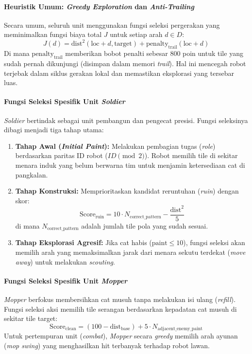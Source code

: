 \paragraph{Heuristik Umum: \textit{Greedy Exploration} dan \textit{Anti-Trailing}}
Secara umum, seluruh unit menggunakan fungsi seleksi pergerakan yang meminimalkan fungsi biaya total $J$ untuk setiap arah $d \in D$:
\begin{equation}
    J(d) = \text{dist}^2(\text{loc} + d, \text{target}) + \text{penalty}_{\text{trail}}(\text{loc} + d)
\end{equation}
Di mana $\text{penalty}_{\text{trail}}$ memberikan bobot penalti sebesar 800 poin untuk tile yang sudah pernah dikunjungi (disimpan dalam memori \textit{trail}). Hal ini mencegah robot terjebak dalam siklus gerakan lokal dan memastikan eksplorasi yang tersebar luas.

\paragraph{Fungsi Seleksi Spesifik Unit \textit{Soldier}}
\textit{Soldier} bertindak sebagai unit pembangun dan pengecat presisi. Fungsi seleksinya dibagi menjadi tiga tahap utama:
\begin{enumerate}
    \item \textbf{Tahap Awal (\textit{Initial Paint}):} Melakukan pembagian tugas (\textit{role}) berdasarkan paritas ID robot ($ID \pmod 2$). Robot memilih tile di sekitar menara induk yang belum berwarna tim untuk menjamin ketersediaan cat di pangkalan.
    \item \textbf{Tahap Konstruksi:} Memprioritaskan kandidat reruntuhan (\textit{ruin}) dengan skor:
    \begin{equation}
        \text{Score}_{\text{ruin}} = 10 \cdot N_{\text{correct\_pattern}} - \frac{\text{dist}^2}{5}
    \end{equation}
    di mana $N_{\text{correct\_pattern}}$ adalah jumlah tile pola yang sudah sesuai.
    \item \textbf{Tahap Eksplorasi Agresif:} Jika cat habis ($\text{paint} \le 10$), fungsi seleksi akan memilih arah yang memaksimalkan jarak dari menara sekutu terdekat (\textit{move away}) untuk melakukan \textit{scouting}.
\end{enumerate}

\paragraph{Fungsi Seleksi Spesifik Unit \textit{Mopper}}
\textit{Mopper} berfokus membersihkan cat musuh tanpa melakukan isi ulang (\textit{refill}). Fungsi seleksi aksi memilih tile serangan berdasarkan kepadatan cat musuh di sekitar tile target:
\begin{equation}
    \text{Score}_{\text{clean}} = (100 - \text{dist}_{\text{base}}) + 5 \cdot N_{\text{adjacent\_enemy\_paint}}
\end{equation}
Untuk pertempuran unit (\textit{combat}), \textit{Mopper} secara \textit{greedy} memilih arah ayunan (\textit{mop swing}) yang menghasilkan hit terbanyak terhadap robot lawan.

